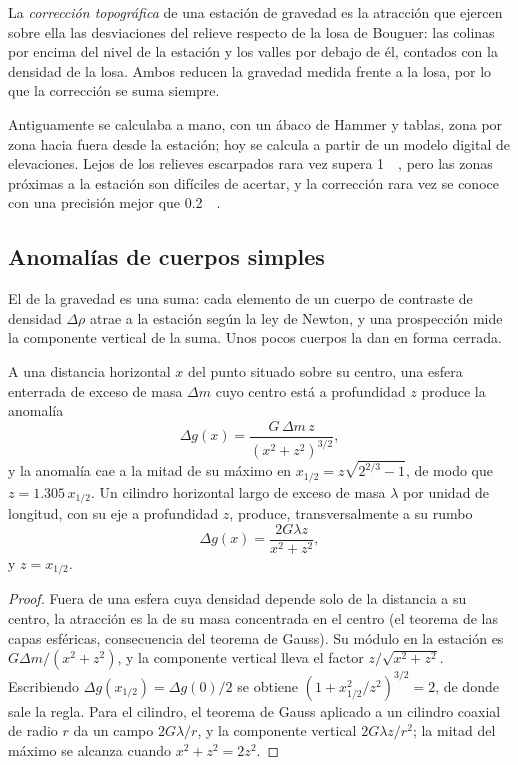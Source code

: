 \begin{definition}\label{def:b3:field-lab-methods-3:terrain}
La \emph{corrección topográfica} de una estación de gravedad
es la atracción que ejercen sobre ella las desviaciones del relieve respecto de la
losa de Bouguer: las colinas por encima del nivel de la estación y
los valles por debajo de él, contados con la densidad de la losa. Ambos
reducen la gravedad medida frente a la losa, por lo que la corrección se
suma siempre.
\end{definition}

Antiguamente se calculaba a mano, con un ábaco de Hammer y tablas, zona por zona
hacia fuera desde la estación; hoy se calcula a partir de un modelo digital
de elevaciones. Lejos de los relieves escarpados rara vez supera \qty{1}{\milli\gal},
pero las zonas próximas a la estación son difíciles de acertar, y la
corrección rara vez se conoce con una precisión mejor que \qty{0.2}{\milli\gal}.

\subsection{Anomalías de cuerpos simples}

El  de la gravedad es una suma: cada elemento de un cuerpo de
contraste de densidad $\Delta\rho$ atrae a la estación según la ley de Newton, y
una prospección mide la componente vertical de la suma. Unos pocos cuerpos la dan
en forma cerrada.

\begin{theorem}\label{thm:b3:field-lab-methods-3:sphere}
A una distancia horizontal $x$ del punto situado sobre su centro, una esfera enterrada
de exceso de masa $\Delta m$ cuyo centro está a profundidad $z$ produce la
anomalía
\[
\Delta g(x) = \frac{G\,\Delta m\,z}{(x^2 + z^2)^{3/2}} ,
\]
y la anomalía cae a la mitad de su máximo en $x_{1/2} = z\sqrt{2^{2/3} - 1}$,
de modo que $z = 1.305\,x_{1/2}$. Un cilindro horizontal largo de exceso de masa
$\lambda$ por unidad de longitud, con su eje a profundidad $z$, produce, transversalmente a su
rumbo
\[
\Delta g(x) = \frac{2G\lambda z}{x^2 + z^2} ,
\]
y $z = x_{1/2}$.
\end{theorem}

\begin{proof}
Fuera de una esfera cuya densidad depende solo de la distancia a su
centro, la atracción es la de su masa concentrada en el centro (el
teorema de las capas esféricas, consecuencia del teorema de Gauss). Su módulo en la
estación es $G\Delta m/(x^2 + z^2)$, y la componente vertical lleva el
factor $z/\sqrt{x^2 + z^2}$. Escribiendo $\Delta g(x_{1/2}) =
\Delta g(0)/2$ se obtiene $(1 + x_{1/2}^2/z^2)^{3/2} = 2$, de donde sale la regla. Para
el cilindro, el teorema de Gauss aplicado a un cilindro coaxial de radio $r$ da
un campo $2G\lambda/r$, y la componente vertical $2G\lambda z/r^2$;
la mitad del máximo se alcanza cuando $x^2 + z^2 = 2z^2$.
\end{proof}

